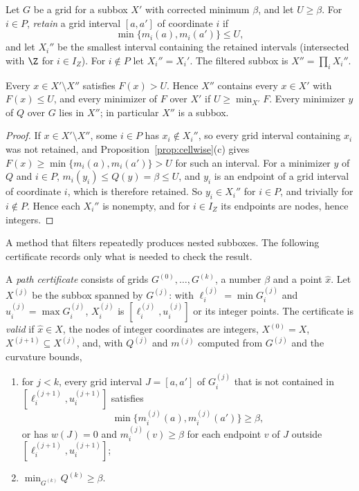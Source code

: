 \begin{definition}\label{def:filter}
Let $G$ be a grid for a subbox $X'$ with corrected minimum $\beta$, and let
$U\ge\beta$. For $i\in P$, \emph{retain} a grid interval $[a,a']$ of
coordinate $i$ if
\begin{equation}\label{eq:retain}
\min\{m_i(a),m_i(a')\}\le U ,
\end{equation}
and let $X_i''$ be the smallest interval containing the retained intervals
(intersected with $\Z$ for $i\in I_Z$). For $i\notin P$ let $X_i''=X_i'$. The
filtered subbox is $X''=\prod_iX_i''$.
\end{definition}

\begin{proposition}\label{prop:filter}
Every $x\in X'\setminus X''$ satisfies $F(x)>U$. Hence $X''$ contains every
$x\in X'$ with $F(x)\le U$, and every minimizer of $F$ over $X'$ if
$U\ge\min_{X'}F$. Every minimizer $y$ of $Q$ over $G$ lies in $X''$; in
particular $X''$ is a subbox.
\end{proposition}

\begin{proof}
If $x\in X'\setminus X''$, some $i\in P$ has $x_i\notin X_i''$, so every grid
interval containing $x_i$ was not retained, and
Proposition~\ref{prop:cellwise}(c) gives $F(x)\ge\min\{m_i(a),m_i(a')\}>U$
for such an interval. For a minimizer $y$ of $Q$ and $i\in P$,
$m_i(y_i)\le Q(y)=\beta\le U$, and $y_i$ is an endpoint of a grid interval of
coordinate $i$, which is therefore retained. So $y_i\in X_i''$ for $i\in P$,
and trivially for $i\notin P$. Hence each $X_i''$ is nonempty, and for
$i\in I_Z$ its endpoints are nodes, hence integers.
\end{proof}

A method that filters repeatedly produces nested subboxes. The following
certificate records only what is needed to check the result.

\begin{definition}\label{def:cert}
A \emph{path certificate} consists of grids $G^{(0)},\dots,G^{(k)}$, a number
$\beta$ and a point $\hat x$. Let $X^{(j)}$ be the subbox spanned by
$G^{(j)}$: with $\ell_i^{(j)}=\min G_i^{(j)}$ and $u_i^{(j)}=\max G_i^{(j)}$,
$X^{(j)}_i$ is $[\ell_i^{(j)},u_i^{(j)}]$ or its integer points. The
certificate is \emph{valid} if $\hat x\in X$, the nodes of integer coordinates
are integers, $X^{(0)}=X$, $X^{(j+1)}\subseteq X^{(j)}$, and, with $Q^{(j)}$
and $m^{(j)}$ computed from $G^{(j)}$ and the curvature bounds,
\begin{enumerate}[label=(C\arabic*)]
\item for $j<k$, every grid interval $J=[a,a']$ of $G^{(j)}_i$ that is not
contained in $[\ell_i^{(j+1)},u_i^{(j+1)}]$ satisfies
\[
\min\bigl\{m^{(j)}_i(a),m^{(j)}_i(a')\bigr\}\ge\beta ,
\]
or has $w(J)=0$ and $m^{(j)}_i(v)\ge\beta$ for each endpoint $v$ of $J$
outside $[\ell_i^{(j+1)},u_i^{(j+1)}]$;
\item $\min_{G^{(k)}}Q^{(k)}\ge\beta$.
\end{enumerate}
\end{definition}

